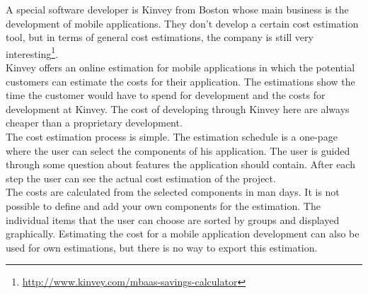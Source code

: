A special software developer is Kinvey from Boston whose main business is the development of mobile applications. They don't develop a certain cost estimation tool, but in terms of general cost estimations, the company is still very interesting\footnote{\url{http://www.kinvey.com/mbaas-savings-calculator}}.
\\
Kinvey offers an online estimation for mobile applications in which the potential customers can estimate the costs for their application. The estimations show the time the customer would have to spend for development and the costs for development at Kinvey. The cost of developing through Kinvey here are always cheaper than a proprietary development.
\\
The cost estimation process is simple. The estimation schedule is a one-page where the user can select the components of his application. The user is guided through some question about features the application should contain. After each step the user can see the actual cost estimation of the project.
\\
The costs are calculated from the selected components in man days. It is not possible to define and add your own components for the estimation. The individual items that the user can choose are sorted by groups and displayed graphically. Estimating the cost for a mobile application development can also be used for own estimations, but there is no way to export this estimation.
